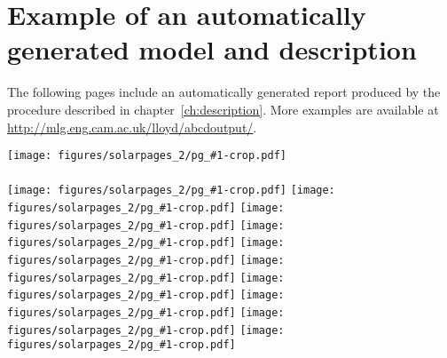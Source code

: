 
\inbpdocument

\chapter{Example of an automatically generated model and description}
\label{ch:example-solar}

The following pages include an automatically generated report produced by the procedure described in chapter~\ref{ch:description}.
More examples are available at \url{http://mlg.eng.cam.ac.uk/lloyd/abcdoutput/}.

\newpage

\newcommand{\solarreportpage}[1]{\texttt{[image: figures/solarpages\_2/pg\_\#1-crop.pdf]}}

\solarreportpage{0002}
\\ \vspace{1cm} \\
\solarreportpage{0003}
\solarreportpage{0004}
\solarreportpage{0005}
\solarreportpage{0006}
\solarreportpage{0007}
\solarreportpage{0008}
\solarreportpage{0009}
\solarreportpage{0010}
\solarreportpage{0011}
\solarreportpage{0012}
